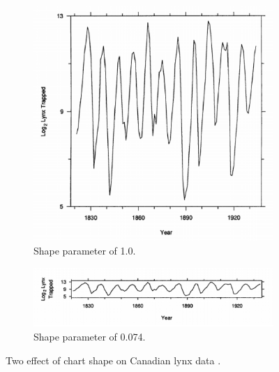 \begin{figure}
	\centering
	\begin{subfigure}[b]{0.45\textwidth}
		\includegraphics[width=\textwidth]{figures/eps/ratioBad.eps}
		\caption{Shape parameter of 1.0.}
		\label{fig:ratioBad}
	\end{subfigure}	
	\begin{subfigure}[b]{0.45\textwidth}
		\includegraphics[width=\textwidth]{figures/eps/ratioGood.eps}
		\caption{Shape parameter of 0.074.}
		\label{fig:ratioGood}
	\end{subfigure}
	\caption{Two effect of chart shape on Canadian lynx data \cite{cleveland1988}.}
	\label{fig:ratio}
\end{figure}

